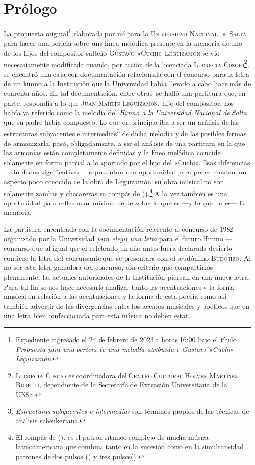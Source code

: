 \chapter{Prólogo}
\label{cap:prologo}

La propuesta original\footnote{Expediente ingresado el 24 de febrero de 2023 a horas 16:00 bajo el título \emph{Propuesta para una pericia de una melodía atribuida a Gustavo «Cuchi» Leguizamón}.} elaborada por mí para la \textsc{Universidad Nacional de Salta} para hacer una pericia sobre una línea melódica presente en la memoria de uno de los hijos del compositor salteño \textsc{Gustavo «Cuchi» Leguizamón} se vio necesariamente modificada cuando, por acción de la licenciada \textsc{Lucrecia Coscio}\footnote{\textsc{Lucrecia Coscio} es coordinadora del \textsc{Centro Cultural Holver Martínez Borelli}, dependiente de la Secretaría de Extensión Universitaria de la UNSa. }, se encontró una caja con documentación relacionada con el concurso para la letra de un himno a la Institución que la Universidad había llevado a cabo hace más de cuarenta años. En tal documentación, entre otras, se halló una partitura que, en parte, respondía a lo que \textsc{Juan Martín Leguizamón}, hijo del compositor, nos había ya referido como la melodía del \emph{Himno a la Universidad Nacional de Salta} que su padre había compuesto. Lo que en principio iba a ser un análisis de las estructuras subyacentes e intermedias\footnote{\emph{Estructuras subyacentes e intermedias} son términos propios de las técnicas de análisis schenkeriano.} de dicha melodía y de las posibles formas de armonizarla, pasó, obligadamente, a ser el análisis de una partitura en la que las armonías están completamente definidas y la línea melódica coincide solamente en forma parcial a lo aportado por el hijo del «Cuchi». Esas diferencias ---sin dudas significativas--- representan una oportunidad para poder mostrar un aspecto poco conocido de la obra de Leguizamón: su obra musical no son solamente zambas y chacareras en compás de \hbox{().}\footnote{El compás de \hbox{().} es el patrón rítmico complejo de mucha música latinoamericana que combina tanto en la sucesión como en la simultaneidad patrones de dos pulsos () y tres pulsos().} A la vez también es una oportunidad para reflexionar mínimamente sobre lo que se ---y lo que no es--- la memoria.

La partitura encontrada con la documentación referente al concurso de 1982 organizado por la Universidad \emph{para elegir una letra} para el futuro Himno ---concurso que al igual que el celebrado un año antes fuera declarado desierto--- contiene la letra del concursante que se presentara con el seudónimo \textsc{Budotizo}. Al no ser esta letra ganadora del concurso, con criterio que compartimos plenamente, las actuales autoridades de la Institución piensan en una nueva letra. Para tal fin se nos hace necesario analizar tanto las acentuaciones y la forma musical en relación a las acentuaciones y la forma de esta poesía como así también advertir de las divergencias entre los acentos musicales y poéticos que en una letra bien confeccionada para esta música no deben estar.


